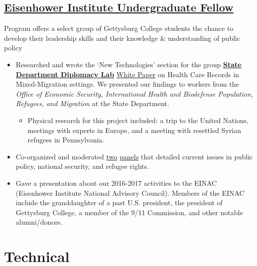 \documentclass[11pt]{article}
\begin{document}
\subsection*{\underline{Eisenhower Institute Undergraduate Fellow}} 
Program offers a select group of Gettysburg College students the chance to develop their leadership skills and their knowledge \& understanding of public policy
\begin{itemize}
\item Researched and wrote the `New Technologies' section for the group \href{https://www.state.gov/s/partnerships/ppp/diplab/}{\textbf{State Department Diplomacy Lab}} \href{https://drive.google.com/file/d/0B5fjh9FZOHSYT1dhVF8yYmd4UEk/view?usp=sharing}{White Paper} on Health Care Records in Mixed-Migration settings. We presented our findings to workers from the \textit{Office of Economic Security, International Health and Biodefense Population, Refugees, and Migration} at the State Department. 
\begin{itemize}
\item Physical research for this project included: a trip to the United Nations, meetings with experts in Europe, and a meeting with resettled Syrian refugees in Pennsylvania.
\end{itemize}
\item Co-organized and moderated \href{http://cs.gettysburg.edu/~duncjo01/assets/media/EI_panel_f16.pdf}{two} \href{http://cs.gettysburg.edu/~duncjo01/assets/media/EI_panel_s17_second.pdf}{panels} that detailed current issues in public policy, national security, and refugee rights. 
\item Gave a presentation about our 2016-2017 activities to the EINAC (Eisenhower Institute National Advisory Council). Members of the EINAC include the granddaughter of a past U.S. president, the president of Gettysburg College, a member of the 9/11 Commission, and other notable alumni/donors.
\end{itemize}

\section*{Technical}
\end{document}
